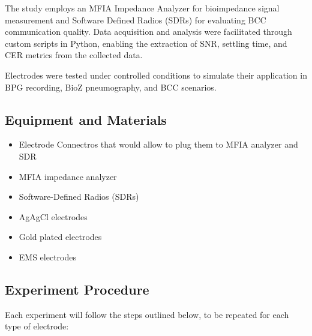 \documentclass[conference]{IEEEtran}
\begin{document}
The study employs an MFIA Impedance Analyzer for bioimpedance signal measurement and Software Defined Radios (SDRs) for evaluating BCC communication quality. Data acquisition and analysis were facilitated through custom scripts in Python, enabling the extraction of SNR, settling time, and CER metrics from the collected data.

Electrodes were tested under controlled conditions to simulate their application in BPG recording, BioZ pneumography, and BCC scenarios.

\subsection{Equipment and Materials}
\begin{itemize}
    \item Electrode Connectros that would allow to plug them to MFIA analyzer and SDR
    \item MFIA impedance analyzer
    \item Software-Defined Radios (SDRs)
    \item AgAgCl electrodes
    \item Gold plated electrodes
    \item EMS electrodes
\end{itemize}

\subsection{Experiment Procedure}
Each experiment will follow the steps outlined below, to be repeated for each type of electrode:
\end{document}

